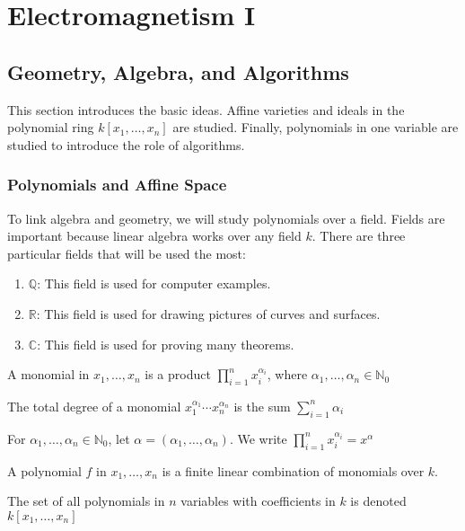 \documentclass[crop=false,class=article,oneside]{standalone}
\begin{document}
    \ifx\ifgeoalg\undefined
        \section*{Electromagnetism I}
        \setcounter{section}{1}
    \fi
\subsection{Geometry, Algebra, and Algorithms}
    This section introduces the basic ideas. Affine varieties and ideals in the polynomial ring $k[x_1,\hdots ,x_n]$ are studied. Finally, polynomials in one variable are studied to introduce the role of algorithms.
    \subsubsection{Polynomials and Affine Space}
    To link algebra and geometry, we will study polynomials over a field. Fields are important because linear algebra works over any field $k$. There are three particular fields that will be used the most:
    \begin{enumerate}
        \item $\mathbb{Q}$: This field is used for computer examples.
        \item $\mathbb{R}$: This field is used for drawing pictures of curves and surfaces.
        \item $\mathbb{C}$: This field is used for proving many theorems.
    \end{enumerate}
    \begin{definition}
    A monomial in $x_1,\hdots,x_n$ is a product $\prod_{i=1}^{n}x_{i}^{\alpha_{i}}$, where $\alpha_{1},\hdots,\alpha_{n}\in\mathbb{N}_0$
    \end{definition}
    \begin{definition}
    The total degree of a monomial $x_1^{\alpha_1}\cdots x_n^{\alpha_n}$ is the sum $\sum_{i=1}^{n}\alpha_{i}$
    \end{definition}
    \begin{notation}
    For $\alpha_1,\hdots, \alpha_n\in \mathbb{N}_0$, let $\alpha = (\alpha_1,\hdots ,\alpha_n)$. We write $\prod_{i=1}^{n}x_{i}^{\alpha_{i}}=x^{\alpha}$
    \end{notation}
    \begin{definition}
    A polynomial $f$ in $x_1,\hdots, x_n$ is a finite linear combination of monomials over $k$.
    \end{definition}
    \begin{notation}
    The set of all polynomials in $n$ variables with coefficients in $k$ is denoted $k[x_1,\hdots ,x_n]$
    \end{notation}
\end{document}
